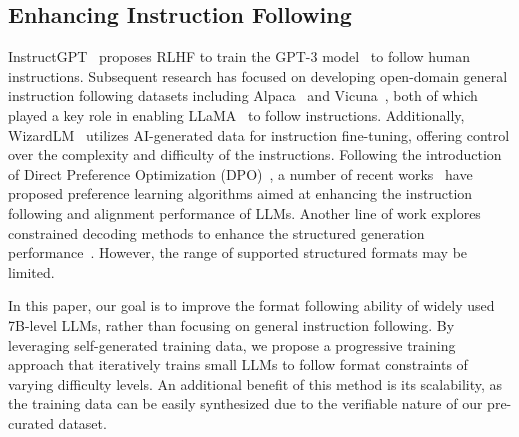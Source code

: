 \subsection{Enhancing Instruction Following}
InstructGPT~\citep{ouyang2022training}  proposes RLHF to train the GPT-3 model~\citep{brown2020language} to follow human instructions.
Subsequent research has focused on developing open-domain general instruction following datasets including Alpaca~\citep{alpaca} and Vicuna~\citep{vicuna2023}, both of which played a key role in enabling LLaMA~\citep{touvron2023llama} to follow instructions.
Additionally, WizardLM~\citep{xu2023wizardlm} utilizes AI-generated data for instruction fine-tuning, offering control over the complexity and difficulty of the instructions.
Following the introduction of Direct Preference Optimization (DPO)~\citep{rafailov2024direct}, a number of recent works~\citep{jiang2023preference, ethayarajh2024kto, hong2024orpo, meng2024simpo} have proposed preference learning algorithms aimed at enhancing the instruction following and alignment performance of LLMs.
Another line of work explores constrained decoding methods to enhance the structured generation performance~\citep{openai2023structured,outlines2023,lmql2023,jsonformer2023,dong2024xgrammar}. However, the range of supported structured formats may be limited.

In this paper, our goal is to improve the format following ability of widely used 7B-level LLMs, rather than focusing on general instruction following. 
By leveraging self-generated training data, we propose a progressive training approach that iteratively trains small LLMs to follow format constraints of varying difficulty levels. 
An additional benefit of this method is its scalability, as the training data can be easily synthesized due to the verifiable nature of our pre-curated \dataset dataset.